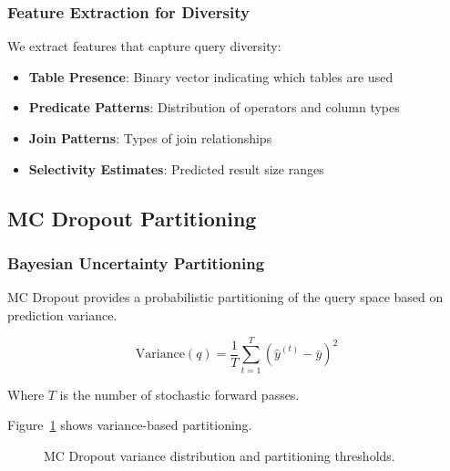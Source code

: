 \subsubsection{Feature Extraction for Diversity}

We extract features that capture query diversity:

\begin{itemize}
    \item \textbf{Table Presence}: Binary vector indicating which tables are used
    \item \textbf{Predicate Patterns}: Distribution of operators and column types
    \item \textbf{Join Patterns}: Types of join relationships
    \item \textbf{Selectivity Estimates}: Predicted result size ranges
\end{itemize}

\subsection{MC Dropout Partitioning}

\subsubsection{Bayesian Uncertainty Partitioning}

MC Dropout provides a probabilistic partitioning of the query space based on prediction variance.

\begin{equation}
\text{Variance}(q) = \frac{1}{T} \sum_{t=1}^T (\hat{y}^{(t)} - \bar{y})^2
\end{equation}

Where $T$ is the number of stochastic forward passes.

Figure~\ref{fig:mc_dropout_partitioning} shows variance-based partitioning.

\begin{figure}[h]
\centering
{}
\caption{MC Dropout variance distribution and partitioning thresholds.}
\label{fig:mc_dropout_partitioning}
\end{figure}

